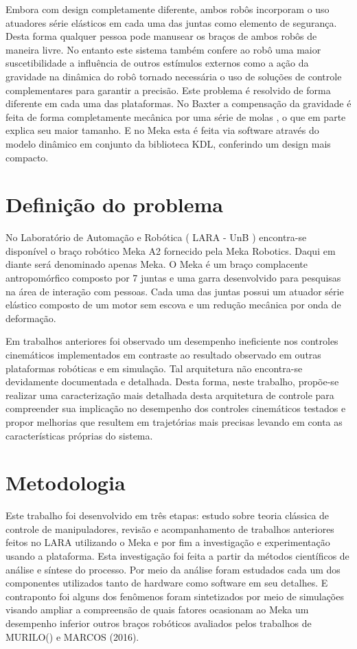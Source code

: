 Embora com design completamente diferente, ambos robôs incorporam o uso atuadores série elásticos em cada uma das juntas como elemento de segurança. Desta forma qualquer pessoa pode manusear os braços de ambos robôs de maneira livre. No entanto este sistema também confere ao robô uma maior suscetibilidade a influência de outros estímulos externos como a ação da gravidade na dinâmica do robô tornado necessária o uso de soluções de controle complementares para garantir a precisão. \cite{nocite} Este problema é resolvido de forma diferente em cada uma das plataformas. No Baxter a compensação da gravidade é feita de forma completamente mecânica por uma série de molas \cite{nobody}, o que em parte explica seu maior tamanho. E no Meka esta é feita via software através do modelo dinâmico em conjunto da biblioteca KDL, conferindo um design mais compacto. \cite{nobody}


\section{Definição do problema}

No Laboratório de Automação e Robótica ( LARA - UnB ) encontra-se disponível o braço robótico Meka A2 fornecido pela Meka Robotics. Daqui em diante será denominado apenas Meka. O Meka é um braço complacente antropomórfico composto por 7 juntas e uma garra desenvolvido para pesquisas na área de interação com pessoas. Cada uma das juntas possui um atuador série elástico composto de um motor sem escova e um redução mecânica por onda de deformação.

Em trabalhos anteriores foi observado um desempenho ineficiente nos controles cinemáticos implementados em contraste ao resultado observado em outras plataformas robóticas e em simulação. Tal arquitetura não encontra-se devidamente documentada e detalhada. Desta forma, neste trabalho, propõe-se realizar uma caracterização mais detalhada desta arquitetura de controle para compreender sua implicação no desempenho dos controles cinemáticos testados e propor melhorias que resultem em trajetórias mais precisas levando em conta as características próprias do sistema.

\section{Metodologia}

Este trabalho foi desenvolvido em três etapas: estudo sobre teoria clássica de controle de manipuladores, revisão e acompanhamento de trabalhos anteriores feitos no LARA utilizando o Meka e por fim a investigação e experimentação usando a plataforma. Esta investigação foi feita a partir da métodos científicos de análise e síntese do processo. Por meio da análise foram estudados cada um dos componentes utilizados tanto de hardware como software em seu detalhes. E contraponto foi alguns dos fenômenos foram sintetizados por meio de simulações visando ampliar a compreensão de quais fatores ocasionam ao Meka um desempenho inferior outros braços robóticos avaliados pelos trabalhos de MURILO() e MARCOS (2016).


